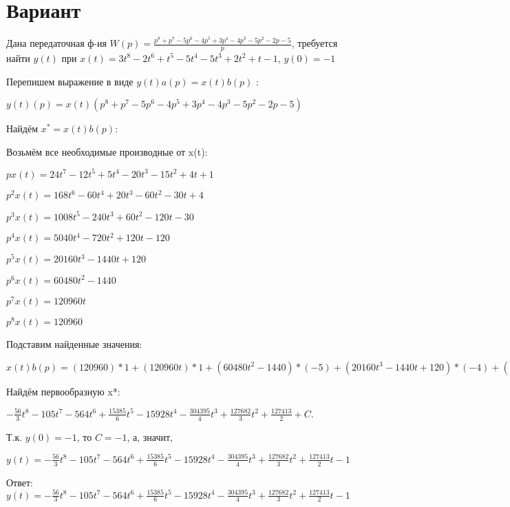 \documentclass{article}
\begin{document}
\section{Вариант}

Дана передаточная ф-ия $W(p)=\frac{p^{8}+p^{7}-5p^{6}-4p^{5}+3p^{4}-4p^{3}-5p^{2}-2p-5}{p}$, требуется найти $y(t)$ при $x(t)=3t^{8}-2t^{6}+t^{5}-5t^{4}-5t^{3}+2t^{2}+t-1$, $y(0)=-1$

Перепишем выражение в виде $y(t)a(p)=x(t)b(p)$ :

$y(t)(p)=x(t)(p^{8}+p^{7}-5p^{6}-4p^{5}+3p^{4}-4p^{3}-5p^{2}-2p-5)$

Найдём $x^*=x(t)b(p)$:

Возьмём все необходимые производные от x(t):

$px(t)=24t^{7}-12t^{5}+5t^{4}-20t^{3}-15t^{2}+4t+1$

$p^2x(t)=168t^{6}-60t^{4}+20t^{3}-60t^{2}-30t+4$

$p^3x(t)=1008t^{5}-240t^{3}+60t^{2}-120t-30$

$p^4x(t)=5040t^{4}-720t^{2}+120t-120$

$p^5x(t)=20160t^{3}-1440t+120$

$p^6x(t)=60480t^{2}-1440$

$p^7x(t)=120960t$

$p^8x(t)=120960$

Подставим найденные значения:

$x(t)b(p) = (120960)*1+(120960t)*1+(60480t^{2}-1440)*(-5)+(20160t^{3}-1440t+120)*(-4)+(5040t^{4}-720t^{2}+120t-120)*3+(1008t^{5}-240t^{3}+60t^{2}-120t-30)*(-4)+(168t^{6}-60t^{4}+20t^{3}-60t^{2}-30t+4)*(-5)+(24t^{7}-12t^{5}+5t^{4}-20t^{3}-15t^{2}+4t+1)*(-2)+(24t^{7}-12t^{5}+5t^{4}-20t^{3}-15t^{2}+4t+1)*(-5)=-168t^{7}-840t^{6}-3948t^{5}+15385t^{4}-79640t^{3}-304395t^{2}+127682t$





Найдём первообразную x*:

$-\frac{56}{3}t^{8}-105t^{7}-564t^{6}+\frac{15385}{6}t^{5}-15928t^{4}-\frac{304395}{4}t^{3}+\frac{127682}{3}t^{2}+\frac{127413}{2}+C.$

Т.к. $y(0)=-1$, то $C=-1$, а, значит, 

$y(t)=-\frac{56}{3}t^{8}-105t^{7}-564t^{6}+\frac{15385}{6}t^{5}-15928t^{4}-\frac{304395}{4}t^{3}+\frac{127682}{3}t^{2}+\frac{127413}{2}t-1$

Ответ: $y(t) = -\frac{56}{3}t^{8}-105t^{7}-564t^{6}+\frac{15385}{6}t^{5}-15928t^{4}-\frac{304395}{4}t^{3}+\frac{127682}{3}t^{2}+\frac{127413}{2}t-1$
\end{document}
